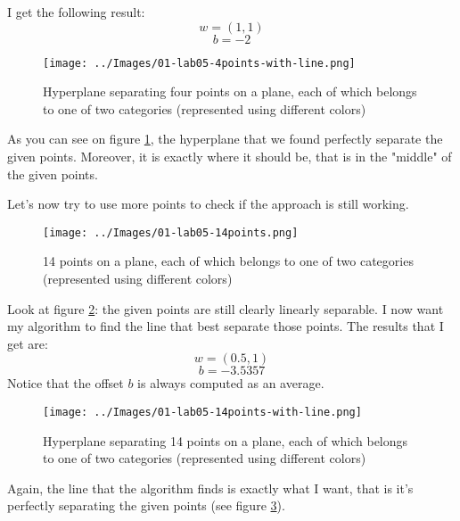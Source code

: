         I get the following result:
        \[w = (1,1)\]
        \[b = -2\]
        \begin{figure}
            \centering
            \texttt{[image: ../Images/01-lab05-4points-with-line.png]}
            \caption{Hyperplane separating four points on a plane, each of which belongs to one of two categories (represented using different colors)}
            \label{01-lab05-4points-with-line}
        \end{figure}
        As you can see on figure \ref{01-lab05-4points-with-line}, the hyperplane that we found perfectly separate the given points. Moreover, it is exactly where it should be, that is in the "middle" of the given points.\par
        Let's now try to use more points to check if the approach is still working.
        \begin{figure}
            \centering
            \texttt{[image: ../Images/01-lab05-14points.png]}
            \caption{14 points on a plane, each of which belongs to one of two categories (represented using different colors)}
            \label{01-lab05-14points}
        \end{figure}
        Look at figure \ref{01-lab05-14points}: the given points are still clearly linearly separable. I now want my algorithm to find the line that best separate those points. The results that I get are:
        \[w = (0.5,1)\]
        \[b = -3.5357\]
        Notice that the offset \(b\) is always computed as an average.
        \begin{figure}
            \centering
            \texttt{[image: ../Images/01-lab05-14points-with-line.png]}
            \caption{Hyperplane separating 14 points on a plane, each of which belongs to one of two categories (represented using different colors)}
            \label{01-lab05-14points-with-line}
        \end{figure}
        Again, the line that the algorithm finds is exactly what I want, that is it's perfectly separating the given points (see figure \ref{01-lab05-14points-with-line}).

